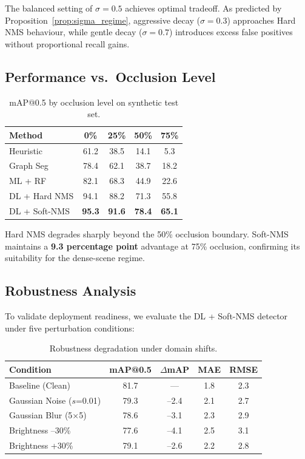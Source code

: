 \documentclass[conference]{IEEEtran}
\begin{document}
The balanced setting of $\sigma = 0.5$ achieves optimal tradeoff. As
predicted by Proposition~\ref{prop:sigma_regime}, aggressive decay
($\sigma = 0.3$) approaches Hard NMS behaviour, while gentle decay
($\sigma = 0.7$) introduces excess false positives without proportional
recall gains.

\subsection{Performance vs.\ Occlusion Level}

\begin{table}[h]
\centering
\caption{mAP@0.5 by occlusion level on synthetic test set.}
\label{tab:occlusion}
\begin{tabular}{lcccc}
\toprule
\textbf{Method} & \textbf{0\%} & \textbf{25\%} & \textbf{50\%} & \textbf{75\%} \\
\midrule
Heuristic     & 61.2 & 38.5 & 14.1 &  5.3 \\
Graph Seg     & 78.4 & 62.1 & 38.7 & 18.2 \\
ML + RF       & 82.1 & 68.3 & 44.9 & 22.6 \\
DL + Hard NMS & 94.1 & 88.2 & 71.3 & 55.8 \\
DL + Soft-NMS & \textbf{95.3} & \textbf{91.6} & \textbf{78.4} & \textbf{65.1} \\
\bottomrule
\end{tabular}
\end{table}

Hard NMS degrades sharply beyond the 50\% occlusion boundary. Soft-NMS
maintains a \textbf{9.3 percentage point} advantage at 75\% occlusion,
confirming its suitability for the dense-scene regime.

\subsection{Robustness Analysis}
\label{sec:robustness}

To validate deployment readiness, we evaluate the DL + Soft-NMS
detector under five perturbation conditions:

\begin{table}[h]
\centering
\caption{Robustness degradation under domain shifts.}
\label{tab:robustness}
\begin{tabular}{lcccc}
\toprule
\textbf{Condition} & \textbf{mAP@0.5} & \textbf{$\Delta$mAP} & \textbf{MAE} & \textbf{RMSE} \\
\midrule
Baseline (Clean)           & 81.7 & ---    & 1.8 & 2.3 \\
Gaussian Noise ($s$=0.01)  & 79.3 & --2.4  & 2.1 & 2.7 \\
Gaussian Blur (5$\times$5) & 78.6 & --3.1  & 2.3 & 2.9 \\
Brightness --30\%          & 77.6 & --4.1  & 2.5 & 3.1 \\
Brightness +30\%           & 79.1 & --2.6  & 2.2 & 2.8 \\
\bottomrule
\end{tabular}
\end{table}
\end{document}
